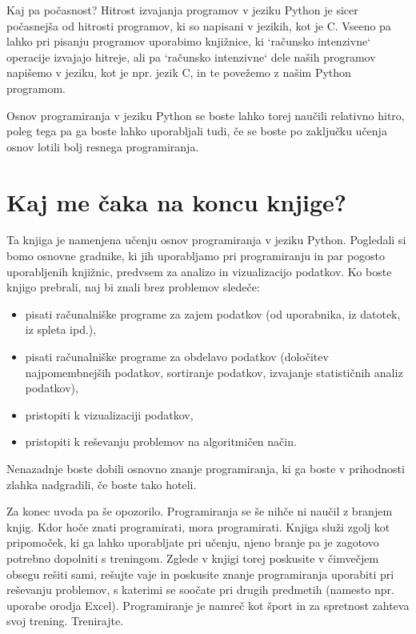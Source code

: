 Kaj pa počasnost? Hitrost izvajanja programov v jeziku Python je sicer počasnejša od hitrosti programov, ki so napisani v jezikih, kot je C. Vseeno pa lahko pri pisanju programov uporabimo knjižnice, ki `računsko intenzivne` operacije izvajajo hitreje, ali pa `računsko intenzivne` dele naših programov napišemo v jeziku, kot je npr. jezik C, in te povežemo z našim Python programom.

Osnov programiranja v jeziku Python se boste lahko torej naučili relativno hitro, poleg tega pa ga boste lahko uporabljali tudi, če se boste po zaključku učenja osnov lotili bolj resnega programiranja. 

\section{Kaj me čaka na koncu knjige?} 

Ta knjiga je namenjena učenju osnov programiranja v jeziku Python. Pogledali si bomo osnovne gradnike, ki jih uporabljamo pri programiranju in par pogosto uporabljenih knjižnic, predvsem za analizo in vizualizacijo podatkov. Ko boste knjigo prebrali, naj bi znali brez problemov sledeče:
\begin{itemize}
    \item pisati računalniške programe za zajem podatkov (od uporabnika, iz datotek, iz spleta ipd.),
    \item pisati računalniške programe za obdelavo podatkov (določitev najpomembnejših podatkov, sortiranje podatkov, izvajanje statističnih analiz podatkov),
    \item pristopiti k vizualizaciji podatkov,
    \item pristopiti k reševanju problemov na algoritmičen način.
\end{itemize}
Nenazadnje boste dobili osnovno znanje programiranja, ki ga boste v prihodnosti zlahka nadgradili, če boste tako hoteli.

Za konec uvoda pa še opozorilo. Programiranja se še nihče ni naučil z branjem knjig. Kdor hoče znati programirati, mora programirati. Knjiga služi zgolj kot pripomoček, ki ga lahko uporabljate pri učenju, njeno branje pa je zagotovo potrebno dopolniti s treningom. Zglede v knjigi torej poskusite v čimvečjem obsegu rešiti sami, rešujte vaje in poskusite znanje programiranja uporabiti pri reševanju problemov, s katerimi se soočate pri drugih predmetih (namesto npr. uporabe orodja Excel). Programiranje je namreč kot šport in za spretnost zahteva svoj trening. Trenirajte.

